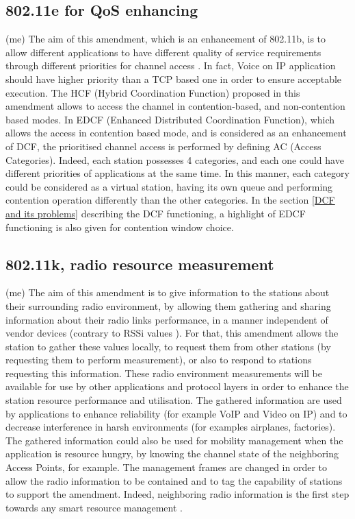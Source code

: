 \documentclass[journal,transmag]{IEEEtran}
\begin{document}
\subsection{802.11e for QoS enhancing} (me)
The aim of this amendment, which is an enhancement of 802.11b, is to allow different applications to have different quality of service requirements through different priorities for channel access \cite{16standard_802.11}. In fact, Voice on IP application should have higher priority than a TCP based one in order to ensure acceptable execution. The HCF (Hybrid Coordination Function) proposed in this amendment allows to access the channel in contention-based, and non-contention based modes. In EDCF (Enhanced Distributed Coordination Function), which allows the access in contention based mode, and is considered as an enhancement of DCF, the prioritised channel access is performed by defining AC (Access Categories). Indeed, each station possesses 4 categories, and each one could have different priorities of applications at the same time. In this manner, each category could be considered as a virtual station, having its own queue and performing contention operation differently than the other categories. In the section \ref{DCF and its problems} describing the DCF functioning, a highlight of EDCF functioning is also given for contention window choice.    


\subsection{802.11k, radio resource measurement} (me)
The aim of this amendment is to give information to the stations about their surrounding radio environment, by allowing them gathering and sharing information about their radio links performance, in a manner independent of vendor devices (contrary to RSSi values \cite{16IEEE802.11k_r_v}). For that, this amendment allows the station to gather these values locally, to request them from other stations (by requesting them to perform measurement), or also to respond to stations requesting this information. These radio environment measurements will be available for use by other applications and protocol layers \cite{16standard_802.11} in order to enhance the station resource performance and utilisation. The gathered information are used by applications to enhance reliability (for example VoIP and Video on IP) and to decrease interference in harsh environments (for examples airplanes, factories). The gathered information could also be used for mobility management when the application is resource hungry, by knowing the channel state of the neighboring Access Points, for example. The management frames are changed in order to allow the radio information to be contained and to tag the capability of stations to support the amendment. Indeed, neighboring radio information is the first step towards any smart resource management \cite{16standard_802.11}.    
\end{document}
